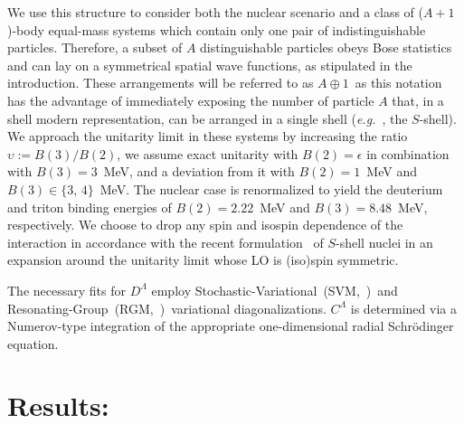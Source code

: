 \documentclass[preprint,12pt]{elsarticle}
\newcommand{\abb}{\mbox{\ensuremath{A\oplus 1}}}
\newcommand{\lec}{C^\Lambda}
\newcommand{\led}{D^\Lambda}
\newcommand{\eg}{\textit{e.g.}~}
\begin{document}
We use this structure to consider both the nuclear scenario and a class of ($A+1$)-body equal-mass systems which contain only one pair of 
indistinguishable particles. Therefore, a subset of $A$ distinguishable particles obeys Bose statistics and can lay on a symmetrical
spatial wave functions, as stipulated in the introduction.
These arrangements will be referred to as \abb~as this notation has the advantage of immediately exposing the number of particle $A$ that, in a shell modern representation, can be arranged in a single shell (\eg , the $S$-shell).
We approach the unitarity limit in these systems by increasing the ratio \mbox{$\upsilon:=B(3)/B(2)$},
we assume exact unitarity with $B(2)=\epsilon$ in combination with $B(3)=3$~MeV, and a deviation from it with $B(2)=1$~MeV and $B(3)\in\lbrace3,\,4\rbrace$~MeV.
The nuclear case is renormalized to yield the deuterium and triton binding energies of $B(2)=2.22$~MeV and $B(3)=8.48$~MeV, respectively. 
We choose to drop any spin and isospin dependence of the interaction in accordance with the recent formulation~\cite{Konig:2016utl}
of $S$-shell nuclei in an expansion around the unitarity limit whose LO is (iso)spin symmetric.

The necessary fits for $\led$ employ Stochastic-Variational~(SVM,~\cite{Suzuki:1631377})~and
Resonating-Group~(RGM,~\cite{PhysRev.52.1083,hmh-rrgm})~variational diagonalizations. $\lec$ is
determined via a Numerov-type integration of the appropriate one-dimensional
radial Schr\"odinger equation.





\section*{Results:}
\end{document}

